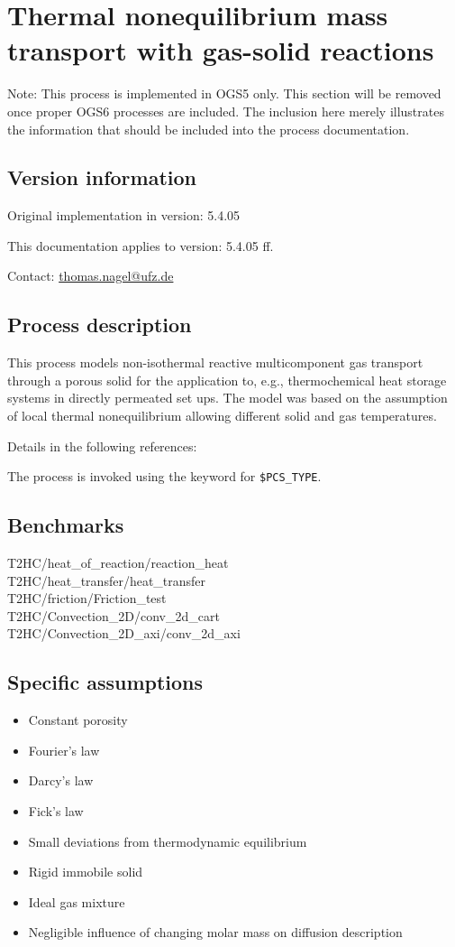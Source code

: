 \section{Thermal nonequilibrium mass transport with gas-solid reactions}
Note: This process is implemented in OGS5 only. This section will be removed once proper OGS6 processes are included. The inclusion here merely illustrates the information that should be included into the process documentation.

\subsection{Version information}
Original implementation in version: 5.4.05

This documentation applies to version: 5.4.05 ff.

Contact: \url{thomas.nagel@ufz.de}

\subsection{Process description}
This process models non-isothermal reactive multicomponent gas transport through a porous solid for the application to, e.g., thermochemical heat storage systems in directly permeated set ups. The model was based on the assumption of local thermal nonequilibrium allowing different solid and gas temperatures.

Details in the following references: \cite{Nagel2013,Shao2013}

The process is invoked using the keyword  for \texttt{\$PCS\_TYPE}.

\subsection{Benchmarks}
T2HC/heat\_of\_reaction/reaction\_heat\\
T2HC/heat\_transfer/heat\_transfer\\
T2HC/friction/Friction\_test\\
T2HC/Convection\_2D/conv\_2d\_cart\\
T2HC/Convection\_2D\_axi/conv\_2d\_axi

\subsection{Specific assumptions}
\begin{itemize}
	\item Constant porosity
	\item Fourier's law
	\item Darcy's law
	\item Fick's law
	\item Small deviations from thermodynamic equilibrium
	\item Rigid immobile solid
	\item Ideal gas mixture
	\item Negligible influence of changing molar mass on diffusion description
\end{itemize}

